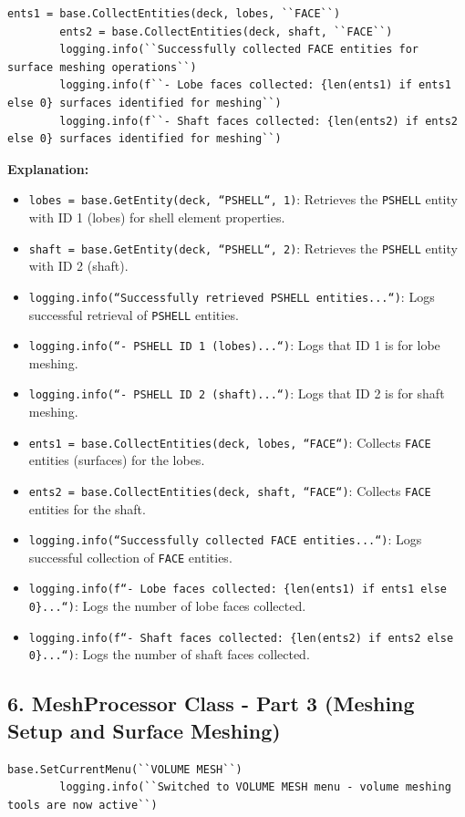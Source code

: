 \documentclass{book}
\begin{document}
\begin{itemize}[leftmargin=*,label=\textbullet]
\begin{lstlisting}[caption={MeshProcessor Class - Shell Element Retrieval},label={lst:meshprocessor_2}]
        ents1 = base.CollectEntities(deck, lobes, ``FACE``)
        ents2 = base.CollectEntities(deck, shaft, ``FACE``)
        logging.info(``Successfully collected FACE entities for surface meshing operations``)
        logging.info(f``- Lobe faces collected: {len(ents1) if ents1 else 0} surfaces identified for meshing``)
        logging.info(f``- Shaft faces collected: {len(ents2) if ents2 else 0} surfaces identified for meshing``)
\end{lstlisting}
\textbf{Explanation:}
\begin{itemize}
    \item \texttt{lobes = base.GetEntity(deck, ``PSHELL``, 1)}: Retrieves the \texttt{PSHELL} entity with ID 1 (lobes) for shell element properties.
    \item \texttt{shaft = base.GetEntity(deck, ``PSHELL``, 2)}: Retrieves the \texttt{PSHELL} entity with ID 2 (shaft).
    \item \texttt{logging.info(``Successfully retrieved PSHELL entities...``)}: Logs successful retrieval of \texttt{PSHELL} entities.
    \item \texttt{logging.info(``- PSHELL ID 1 (lobes)...``)}: Logs that ID 1 is for lobe meshing.
    \item \texttt{logging.info(``- PSHELL ID 2 (shaft)...``)}: Logs that ID 2 is for shaft meshing.
    \item \texttt{ents1 = base.CollectEntities(deck, lobes, ``FACE``)}: Collects \texttt{FACE} entities (surfaces) for the lobes.
    \item \texttt{ents2 = base.CollectEntities(deck, shaft, ``FACE``)}: Collects \texttt{FACE} entities for the shaft.
    \item \texttt{logging.info(``Successfully collected FACE entities...``)}: Logs successful collection of \texttt{FACE} entities.
    \item \texttt{logging.info(f``- Lobe faces collected: \{len(ents1) if ents1 else 0\}...``)}: Logs the number of lobe faces collected.
    \item \texttt{logging.info(f``- Shaft faces collected: \{len(ents2) if ents2 else 0\}...``)}: Logs the number of shaft faces collected.
\end{itemize}

\subsection*{6. MeshProcessor Class - Part 3 (Meshing Setup and Surface Meshing)}
\begin{lstlisting}[caption={MeshProcessor Class - Meshing Setup and Surface Meshing},label={lst:meshprocessor_3}]
        base.SetCurrentMenu(``VOLUME MESH``)
        logging.info(``Switched to VOLUME MESH menu - volume meshing tools are now active``)


\end{lstlisting}
\end{itemize}
\end{document}

